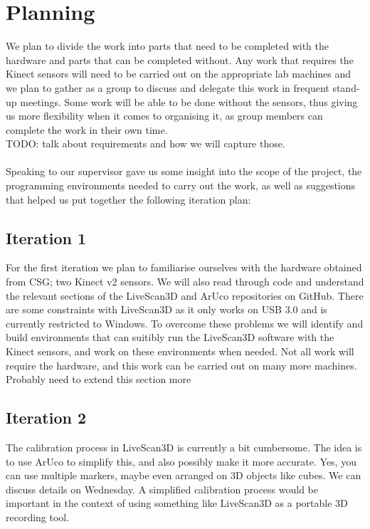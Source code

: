 \documentclass[a4paper,12pt]{article}
\begin{document}
\section*{Planning}
We plan to divide the work into parts that need to be completed with the hardware and parts that can be completed without. Any work that requires the Kinect sensors will need to be carried out on the appropriate lab machines and we plan to gather as a group to discuss and delegate this work in frequent stand-up meetings. Some work will be able to be done without the sensors, thus giving us more flexibility when it comes to organising it, as group members can complete the work in their own time. \\

TODO: talk about requirements and how we will capture those. \\
\\
Speaking to our supervisor gave us some insight into the scope of the project, the programming environments needed to carry out the work, as well as suggestions that helped us put together the following iteration plan:

\subsection*{Iteration 1}
For the first iteration we plan to familiarise ourselves with the hardware obtained from CSG; two Kinect v2 sensors. We will also read through code and understand the relevant sections of the LiveScan3D and ArUco repositories on GitHub. There are some constraints with LiveScan3D as it only works on USB 3.0 and is currently restricted to Windows. To overcome these problems we will identify and build environments that can suitibly run the LiveScan3D software with the Kinect sensors, and work on these environments when needed. Not all work will require the hardware, and this work can be carried out on many more machines.
\\
Probably need to extend this section more

\subsection*{Iteration 2}
The calibration process in LiveScan3D is currently a bit cumbersome. The idea is to use ArUco to simplify this, and also possibly make it more accurate. Yes, you can use multiple markers, maybe even arranged on 3D objects like cubes. We can discuss details on Wednesday. A simplified calibration process would be important in the context of using something like LiveScan3D as a portable 3D recording tool.
\end{document}
